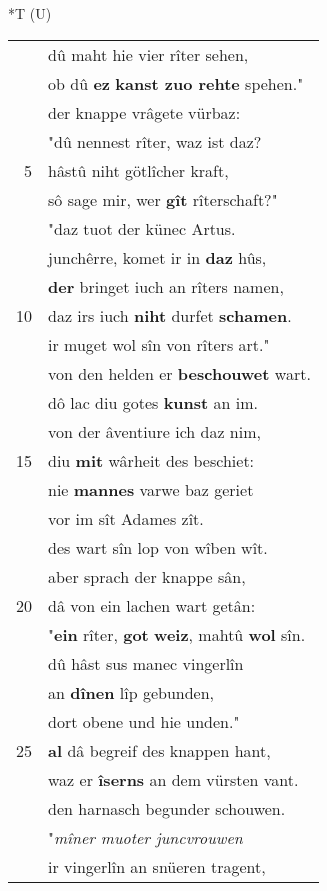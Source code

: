 \documentclass[8pt,a4paper,notitlepage]{article}
\begin{document}
\begin{table}[ht]
\begin{minipage}[t]{0.5\linewidth}
\small
\begin{center}*T (U)
\end{center}
\begin{tabular}{rl}
 & dû maht hie vier rîter sehen,\\ 
 & ob dû \textbf{ez} \textbf{kanst zuo rehte} spehen."\\ 
 & der knappe vrâgete vürbaz:\\ 
 & "dû nennest rîter, waz ist daz?\\ 
5 & hâstû niht götlîcher kraft,\\ 
 & sô sage mir, wer \textbf{gît} rîterschaft?"\\ 
 & "daz tuot der künec Artus.\\ 
 & junchêrre, komet ir in \textbf{daz} hûs,\\ 
 & \textbf{der} bringet iuch an rîters namen,\\ 
10 & daz irs iuch \textbf{niht} durfet \textbf{schamen}.\\ 
 & ir muget wol sîn von rîters art."\\ 
 & von den helden er \textbf{beschouwet} wart.\\ 
 & dô lac diu gotes \textbf{kunst} an im.\\ 
 & von der âventiure ich daz nim,\\ 
15 & diu \textbf{mit} wârheit des beschiet:\\ 
 & nie \textbf{mannes} varwe baz geriet\\ 
 & vor im sît Adames zît.\\ 
 & des wart sîn lop von wîben wît.\\ 
 & aber sprach der knappe sân,\\ 
20 & dâ von ein lachen wart getân:\\ 
 & "\textbf{ein} rîter, \textbf{got} \textbf{weiz}, mahtû \textbf{wol} sîn.\\ 
 & dû hâst sus manec vingerlîn\\ 
 & an \textbf{dînen} lîp gebunden,\\ 
 & dort obene und hie unden."\\ 
25 & \textbf{al} dâ begreif des knappen hant,\\ 
 & waz er \textbf{îserns} an dem vürsten vant.\\ 
 & den harnasch begunder schouwen.\\ 
 & "\textit{mîner muoter juncvrouwen}\\ 
 & ir vingerlîn an snüeren tragent,\\ 

\end{tabular}
\end{minipage}
\end{table}
\end{document}
